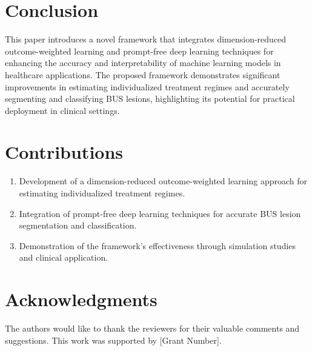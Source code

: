 \documentclass[12pt]{article}
\begin{document}
\section{Conclusion}
This paper introduces a novel framework that integrates dimension-reduced outcome-weighted learning and prompt-free deep learning techniques for enhancing the accuracy and interpretability of machine learning models in healthcare applications. The proposed framework demonstrates significant improvements in estimating individualized treatment regimes and accurately segmenting and classifying BUS lesions, highlighting its potential for practical deployment in clinical settings.

\section{Contributions}
\begin{enumerate}
    \item Development of a dimension-reduced outcome-weighted learning approach for estimating individualized treatment regimes.
    \item Integration of prompt-free deep learning techniques for accurate BUS lesion segmentation and classification.
    \item Demonstration of the framework's effectiveness through simulation studies and clinical application.
\end{enumerate}

\section*{Acknowledgments}
The authors would like to thank the reviewers for their valuable comments and suggestions. This work was supported by [Grant Number].

\printbibliography
\end{document}
